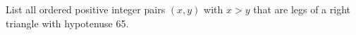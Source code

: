 List all ordered positive integer pairs $(x,y)$ with $x>y$ that are legs of a right triangle with hypotenuse 65.
